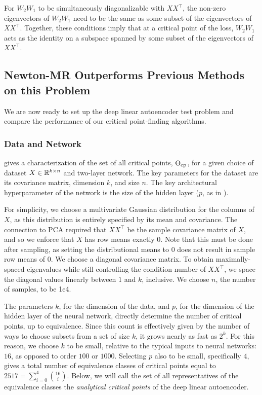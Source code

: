 \documentclass[../../thesis.tex]{subfiles}
\begin{document}
For $W_2 W_1$ to be simultaneously diagonalizable with $XX^\top$,
the non-zero eigenvectors of $W_2W_1$
need to be the same as some subset of the eigenvectors of $XX^\top$.
Together, these conditions imply that
at a critical point of the loss,
$W_2W_1$ acts as the identity
on a subspace spanned by some subset of the eigenvectors of $XX^\top$.

\subsection{Newton-MR Outperforms Previous Methods on this Problem}%

We are now ready to set up the deep linear autoencoder
test problem and compare the performance of our
critical point-finding algorithms.

\subsubsection{Data and Network}

 gives a characterization
of the set of all critical points, $\Theta_{\mathrm{cp}}$,
for a given choice of dataset $X\in\mathbb{R}^{k \times n}$ and two-layer network.
The key parameters for the dataset are its covariance matrix,
dimension $k$, and size $n$.
The key architectural hyperparameter of the network is the
size of the hidden layer
($p$, as in ).

For simplicity, we choose a multivariate Gaussian distribution
for the columns of $X$,
as this distribution is entirely specified by its mean and covariance.
The connection to PCA
required that $XX^\top$ be the sample covariance matrix of $X$,
and so we enforce that $X$ has row means exactly $0$.
Note that this must be done after sampling,
as setting the distributional means to $0$ does not
result in sample row means of $0$.
We choose a diagonal covariance matrix.
To obtain maximally-spaced eigenvalues while still
controlling the condition number of $XX^\top$,
we space the diagonal values linearly between $1$ and $k$,
inclusive.
We choose $n$, the number of samples, to be 1e4.

The parameters $k$, for the dimension of the data,
and $p$, for the dimension of the hidden layer of the neural network,
directly determine the number of critical points,
up to equivalence.
Since this count is effectively
given by the number of ways to choose subsets from a set of size $k$,
it grows nearly as fast as $2^k$.
For this reason, we choose $k$ to be small, relative to the typical
inputs to neural networks: $16$, as opposed to order $100$ or $1000$.
Selecting $p$ also to be small, specifically $4$,
gives a total number of equivalence classes of critical points equal to
$2517 = \sum_{i=0}^4 \binom{16}{i}$.
Below, we will call the set of all representatives of the
equivalence classes the \emph{analytical critical points}
of the deep linear autoencoder.
\end{document}
